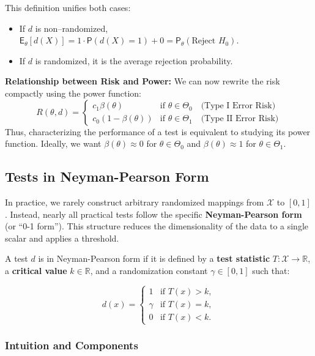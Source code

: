 This definition unifies both cases:
\begin{itemize}
    \item If $d$ is non--randomized, $\mathsf{E}_{\theta}[d(X)] = 1 \cdot \mathsf{P}(d(X)=1) + 0 = \mathsf{P}_{\theta}(\text{Reject } H_0)$.
    \item If $d$ is randomized, it is the average rejection probability.
\end{itemize}

\textbf{Relationship between Risk and Power:}
We can now rewrite the risk compactly using the power function:
\[
R(\theta, d) = 
\begin{cases} 
c_1 \beta(\theta) & \text{if } \theta \in \Theta_0 \quad \text{(Type I Error Risk)} \\ 
c_0 (1 - \beta(\theta)) & \text{if } \theta \in \Theta_1 \quad \text{(Type II Error Risk)}
\end{cases}
\]
Thus, characterizing the performance of a test is equivalent to studying its power function. Ideally, we want $\beta(\theta) \approx 0$ for $\theta \in \Theta_0$ and $\beta(\theta) \approx 1$ for $\theta \in \Theta_1$.

\subsection{Tests in Neyman-Pearson Form}
\label{sec:tests_np_form}

In practice, we rarely construct arbitrary randomized mappings from $\mathcal{X}$ to $[0,1]$. Instead, nearly all practical tests follow the specific \textbf{Neyman-Pearson form} (or ``0-1 form''). This structure reduces the dimensionality of the data to a single scalar and applies a threshold.

\begin{definition}
A test $d$ is in Neyman-Pearson form if it is defined by a \textbf{test statistic} $T: \mathcal{X} \to \mathbb{R}$, a \textbf{critical value} $k \in \mathbb{R}$, and a randomization constant $\gamma \in [0,1]$ such that:

\[
d(x) = \begin{cases} 
1 & \text{if } T(x) > k, \\ 
\gamma & \text{if } T(x) = k, \\ 
0 & \text{if } T(x) < k. 
\end{cases}
\]
\end{definition}



\subsubsection{Intuition and Components}

